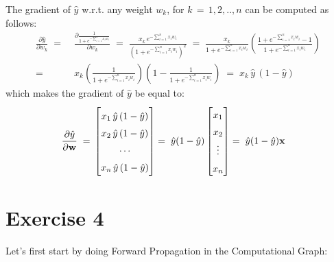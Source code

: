 \documentclass[12pt]{report}
\begin{document}
The gradient of $\hat{y}$ w.r.t. any weight $w_k$, for $k \,=\, 1, 2, .., n$ can be computed
as follows:
\begin{align*}
    \frac{\partial \hat{y}}{\partial w_k} \;=&\;
    \frac{\partial \frac{1}{1 + e^{-\sum_{i=1}^n x_iw_i}}}{\partial w_k} \;=\;
    \frac{x_k \, e^{-\sum_{i=1}^n x_iw_i}}{\left(1 + e^{-\sum_{i=1}^n x_iw_i}\right)^2} \;=\;
    \frac{x_k}{1 + e^{-\sum_{i=1}^n x_iw_i}} \left(\frac{1 + e^{-\sum_{i=1}^n x_iw_i} - 1}
                   {1 + e^{-\sum_{i=1}^n x_iw_i}} \right) \\
    =&\; x_k \left(\frac{1}{1 + e^{-\sum_{i=1}^n x_iw_i}}\right)
             \left(1 - \frac{1}{1 + e^{-\sum_{i=1}^n x_iw_i}} \right) \;=\;
    x_k \,\hat{y} \, (1 - \hat{y})
\end{align*}
which makes the gradient of $\hat{y}$ be equal to:
\begin{align*}
    \frac{\partial \hat{y}}{\partial \textbf{w}} \;=&\;
    \renewcommand\arraystretch{1.5}
    \begin{bmatrix}
        x_1 \,\hat{y}\, (1 - \hat{y}) \\
        x_2 \,\hat{y}\, (1 - \hat{y}) \\
        \cdots \\
        x_n \,\hat{y}\, (1 - \hat{y})
    \end{bmatrix}
    =\; \hat{y}(1 - \hat{y})
    \renewcommand\arraystretch{1.5}
    \begin{bmatrix}
        x_1 \\
        x_2 \\
        \vdots \\
        x_n
    \end{bmatrix}
    =\; \hat{y}(1 - \hat{y})\textbf{x}
\end{align*}
\clearpage

\section*{Exercise 4}

Let's first start by doing Forward Propagation in the Computational Graph:
\end{document}
